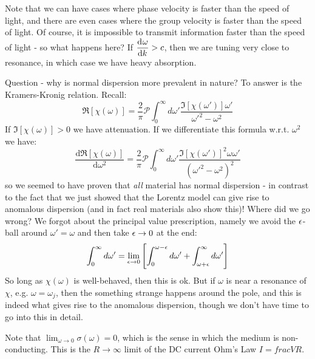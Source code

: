 \begin{itemize}
    Note that we can have cases where phase velocity is faster than the speed of light, and there are even cases where the group velocity is faster than the speed of light. Of course, it is impossible to transmit information faster than the speed of light - so what happens here? If $\dod{\omega}{k} > c$, then we are tuning very close to resonance, in which case we have heavy absorption.

    Question - why is normal dispersion more prevalent in nature? To answer is the Kramers-Kronig relation. Recall:
    \begin{equation}
        \Re[\chi(\omega)] = \frac{2}{\pi}\mathcal{P}\int_0^\infty d\omega'\frac{\Im[\chi(\omega')]\omega'}{\omega'^2 - \omega^2}
    \end{equation}
    If $\Im[\chi(\omega)] > 0$ we have attenuation. If we differentiate this formula w.r.t. $\omega^2$ we have:
    \begin{equation}
        \frac{\text{d}\Re[\chi(\omega)]}{\text{d}\omega^2} = \frac{2}{\pi}\mathcal{P}\int_0^\infty d\omega' \frac{\Im[\chi(\omega')]^2\omega \omega'}{(\omega'^2 - \omega^2)^2}
    \end{equation}
    so we seemed to have proven that \emph{all} material has normal dispersion - in contrast to the fact that we just showed that the Lorentz model can give rise to anomalous dispersion (and in fact real materials also show this)! Where did we go wrong? We forgot about the principal value prescription, namely we avoid the $\epsilon$-ball around $\omega' = \omega$ and then take $\epsilon \to 0$ at the end:
    \begin{equation}
        \int_0^\infty d\omega' = \lim_{\epsilon \to 0}\left[\int_0^{\omega - \epsilon}d\omega' + \int_{\omega + \epsilon}^{\infty}d\omega'\right]
    \end{equation}
    So long as $\chi(\omega)$ is well-behaved, then this is ok. But if $\omega$ is near a resonance of $\chi$, e.g. $\omega = \omega_j$, then the something strange happens around the pole, and this is indeed what gives rise to the anomalous dispersion, though we don't have time to go into this in detail.

    Note that $\lim_{\omega \to 0} \sigma(\omega) =0$, which is the sense in which the medium is non-conducting. This is the $R \to \infty$ limit of the DC current Ohm's Law $I = frac{V}{R}$.


\end{itemize}
